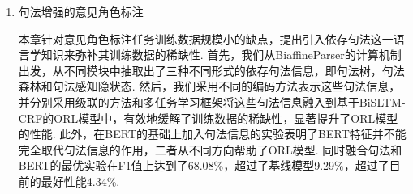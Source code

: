 \begin{enumerate}


    \item 句法增强的意见角色标注

          本章针对意见角色标注任务训练数据规模小的缺点，提出引入依存句法这一语言学知识来弥补其训练数据的稀缺性.
          首先，我们从BiaffineParser的计算机制出发，从不同模块中抽取出了三种不同形式的依存句法信息，即句法树，句法森林和句法感知隐状态. 然后，我们采用不同的编码方法表示这些句法信息，并分别采用级联的方法和多任务学习框架将这些句法信息融入到基于BiSLTM-CRF的ORL模型中，有效地缓解了训练数据的稀缺性，显著提升了ORL模型的性能. 此外，在BERT的基础上加入句法信息的实验表明了BERT特征并不能完全取代句法信息的作用，二者从不同方向帮助了ORL模型. 同时融合句法和BERT的最优实验在F1值上达到了68.08\%，超过了基线模型9.29\%，超过了目前的最好性能4.34\%.
\end{enumerate}


